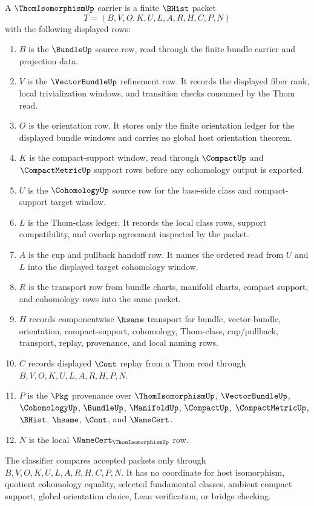 \begin{definition}
\label{def:thom-isomorphism-carrier}
A $\ThomIsomorphismUp$ carrier is a finite $\BHist$ packet
$$
T=(B,V,O,K,U,L,A,R,H,C,P,N)
$$
with the following displayed rows:
\begin{enumerate}
\item $B$ is the $\BundleUp$ source row, read through the finite bundle carrier and projection data.
\item $V$ is the $\VectorBundleUp$ refinement row. It records the displayed fiber rank, local trivialization windows, and transition checks consumed by the Thom read.
\item $O$ is the orientation row. It stores only the finite orientation ledger for the displayed bundle windows and carries no global host orientation theorem.
\item $K$ is the compact-support window, read through $\CompactUp$ and $\CompactMetricUp$ support rows before any cohomology output is exported.
\item $U$ is the $\CohomologyUp$ source row for the base-side class and compact-support target window.
\item $L$ is the Thom-class ledger. It records the local class rows, support compatibility, and overlap agreement inspected by the packet.
\item $A$ is the cup and pullback handoff row. It names the ordered read from $U$ and $L$ into the displayed target cohomology window.
\item $R$ is the transport row from bundle charts, manifold charts, compact support, and cohomology rows into the same packet.
\item $H$ records componentwise $\hsame$ transport for bundle, vector-bundle, orientation, compact-support, cohomology, Thom-class, cup/pullback, transport, replay, provenance, and local naming rows.
\item $C$ records displayed $\Cont$ replay from a Thom read through $B,V,O,K,U,L,A,R,H,P,N$.
\item $P$ is the $\Pkg$ provenance over $\ThomIsomorphismUp$, $\VectorBundleUp$, $\CohomologyUp$, $\BundleUp$, $\ManifoldUp$, $\CompactUp$, $\CompactMetricUp$, $\BHist$, $\hsame$, $\Cont$, and $\NameCert$.
\item $N$ is the local $\NameCert_{\ThomIsomorphismUp}$ row.
\end{enumerate}
The classifier compares accepted packets only through $B,V,O,K,U,L,A,R,H,C,P,N$. It has no coordinate for host isomorphism, quotient cohomology equality, selected fundamental classes, ambient compact support, global orientation choice, Lean verification, or bridge checking.
\end{definition}

